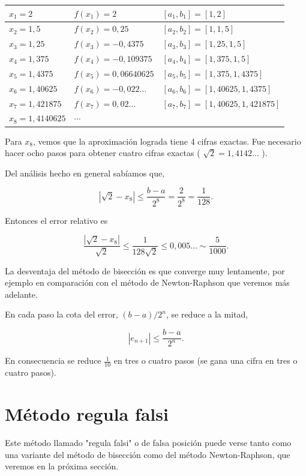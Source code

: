 \documentclass[10pt]{book}
\begin{document}
\begin{center}
\begin{tabular}{|l|l|l|}
\hline
$x_{1}=2$ & $f\left(x_{1}\right)=2$ & $\left[a_{1}, b_{1}\right]=[1,2]$ \\
\hline
$x_{2}=1,5$ & $f\left(x_{2}\right)=0,25$ & $\left[a_{2}, b_{2}\right]=[1,1,5]$ \\
\hline
$x_{3}=1,25$ & $f\left(x_{3}\right)=-0,4375$ & $\left[a_{3}, b_{3}\right]=[1,25,1,5]$ \\
\hline
$x_{4}=1,375$ & $f\left(x_{4}\right)=-0,109375$ & $\left[a_{4}, b_{4}\right]=[1,375,1,5]$ \\
\hline
$x_{5}=1,4375$ & $f\left(x_{5}\right)=0,06640625$ & $\left[a_{5}, b_{5}\right]=[1,375,1,4375]$ \\
\hline
$x_{6}=1,40625$ & $f\left(x_{6}\right)=-0,022 \ldots$ & $\left[a_{6}, b_{6}\right]=[1,40625,1,4375]$ \\
\hline
$x_{7}=1,421875$ & $f\left(x_{7}\right)=0,02 \ldots$ & $\left[a_{7}, b_{7}\right]=[1,40625,1,421875]$ \\
\hline
$x_{8}=1,4140625$ & $\cdots$ &  \\
\hline
\end{tabular}
\end{center}

Para $x_{8}$, vemos que la aproximación lograda tiene 4 cifras exactas. Fue necesario hacer ocho pasos para obtener cuatro cifras exactas ( $\sqrt{2}=1,4142 \ldots$ ).

Del análisis hecho en general sabíamos que,

$$
\left|\sqrt{2}-x_{8}\right| \leq \frac{b-a}{2^{8}}=\frac{2}{2^{8}}=\frac{1}{128} .
$$

Entonces el error relativo es

$$
\frac{\left|\sqrt{2}-x_{8}\right|}{\sqrt{2}} \leq \frac{1}{128 \sqrt{2}} \leq 0,005 \ldots \sim \frac{5}{1000} .
$$

La desventaja del método de bisección es que converge muy lentamente, por ejemplo en comparación con el método de Newton-Raphson que veremos más adelante.

En cada paso la cota del error, $(b-a) / 2^{n}$, se reduce a la mitad,

$$
\left|e_{n+1}\right| \leq \frac{b-a}{2^{n}} .
$$

En consecuencia se reduce $\frac{1}{10}$ en tres o cuatro pasos (se gana una cifra en tres o cuatro pasos).

\section{Método regula falsi}
Este método llamado "regula falsi" o de falsa posición puede verse tanto como una variante del método de bisección como del método Newton-Raphson, que veremos en la próxima sección.
\end{document}
